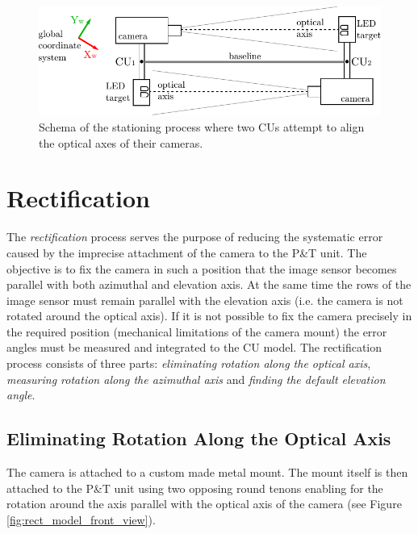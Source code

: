 \begin{figure}[htb]
	\centering
	\includegraphics[width=0.7\linewidth]{fig/stationing.pdf}
	\caption{Schema of the stationing process where two CUs attempt to align the optical axes of their cameras.}
	\label{fig:stationing_aiming}
\end{figure}

\section{Rectification} \label{txt:rectification}

The \textit{rectification} process serves the purpose of reducing the systematic error caused by the imprecise attachment of the camera to the P\&T unit. The objective is to fix the camera in such a position that the image sensor becomes parallel  with both azimuthal and elevation axis. At the same time the rows of the image sensor must remain parallel with the elevation axis (i.e. the camera is not rotated around the optical axis). If it is not possible to fix the camera precisely in the required position (mechanical limitations of the camera mount) the error angles must be measured and integrated to the CU model. The rectification process consists of three parts: \textit{eliminating rotation along the optical axis}, \textit{measuring rotation along the azimuthal axis} and \textit{finding the default elevation angle}.

\subsection{Eliminating Rotation Along the Optical Axis}

The camera is attached to a custom made metal mount. The mount itself is then attached to the P\&T unit using two opposing round tenons enabling for the rotation around the axis parallel with the optical axis of the camera (see Figure \ref{fig:rect_model_front_view}).

